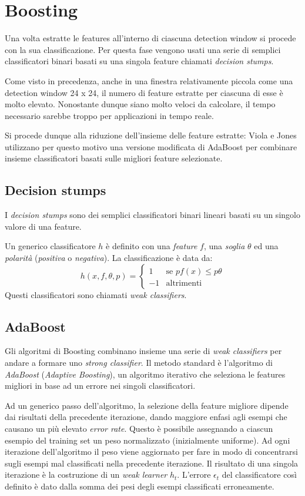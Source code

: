 \section{Boosting}
Una volta estratte le features all'interno di ciascuna detection window si procede con la sua classificazione. Per questa fase vengono usati una serie di semplici classificatori binari basati su una singola feature chiamati \emph{decision stumps}. 

Come visto in precedenza, anche in una finestra relativamente piccola come una detection window 24 x 24, il numero di feature estratte per ciascuna di esse è molto elevato. Nonostante dunque siano molto veloci da calcolare, il tempo necessario sarebbe troppo per applicazioni in tempo reale. 

Si procede dunque alla riduzione dell'insieme delle feature estratte: Viola e Jones utilizzano per questo motivo una versione modificata di AdaBoost per combinare insieme classificatori basati sulle migliori feature selezionate.

\subsection{Decision stumps}

I \emph{decision stumps} sono dei semplici classificatori binari lineari basati su un singolo valore di una feature. 

Un generico classificatore $h$ è definito con una \emph{feature} $f$, una \emph{soglia} $\theta$ ed una \emph{polarità} (\emph{positiva} o  \emph{negativa}). La classificazione è data da:
$$
h(x, f, \theta, p) =
\left\{
\begin{array}{ll}
1 & \mbox{se } p f(x) \leq p \theta \\
-1 & \mbox{altrimenti}
\end{array}
\right.
$$
Questi classificatori sono chiamati \emph{weak classifiers}.

\subsection{AdaBoost}

Gli algoritmi di Boosting combinano insieme una serie di \emph{weak classifiers} per andare a formare uno \emph{strong classifier}. Il metodo standard è l'algoritmo di \emph{AdaBoost} (\emph{Adaptive Boosting}), un algoritmo iterativo che seleziona le features migliori in base ad un errore nei singoli classificatori.

Ad un generico passo dell'algoritmo, la selezione della feature migliore dipende dai risultati della precedente iterazione, dando maggiore enfasi agli esempi che causano un più elevato \emph{error rate}.
Questo è possibile assegnando a ciascun esempio del training set un peso normalizzato (inizialmente uniforme). Ad ogni iterazione dell'algoritmo il peso viene aggiornato per fare in modo di concentrarsi sugli esempi mal classificati nella precedente iterazione. Il risultato di una singola iterazione è la costruzione di un \emph{weak learner} $h_t$. L'errore $\epsilon_t$ del classificatore così definito è dato dalla somma dei pesi degli esempi classificati erroneamente.

